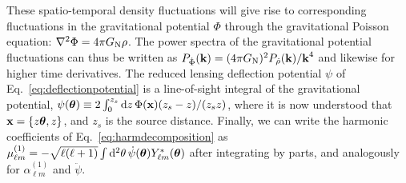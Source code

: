 \documentclass[prd,aps,twocolumn,nofootinbib,superscriptaddress,preprintnumbers,balancelastpage,longbibliography,floatfix]{revtex4-1}
\begin{document}
These spatio-temporal density fluctuations will give rise to corresponding fluctuations in the gravitational potential $\Phi$ through the gravitational Poisson equation: $\nabla^2 \Phi = 4 \pi G_\mathrm{N} \rho$. The power spectra of the gravitational potential fluctuations can thus be written as $P_{\dot{\Phi}}(\boldsymbol{\mathbf{k}}) = (4\pi G_\mathrm{N})^2 P_{\dot{\rho}}(\boldsymbol{\mathbf{k}})/\boldsymbol{\mathbf{k}}^4$ and likewise for higher time derivatives. The reduced lensing deflection potential $\psi$ of Eq.~\eqref{eq:deflectionpotential} is a line-of-sight integral of the gravitational potential, $\psi(\boldsymbol{\mathbf{\theta}}) \equiv 2 \int_0^{z_s} \mathrm{d} z \, \Phi(\boldsymbol{\mathbf{x}}) (z_s - z)/(z_s z)$, where it is now understood that $\boldsymbol{\mathbf{x}} = \lbrace z \boldsymbol{\mathbf{\theta}},z\rbrace$, and $z_s$ is the source distance. Finally, we can write the harmonic coefficients of Eq.~\eqref{eq:harmdecomposition} as $\mu_{\ell m}^{(1)} = - \sqrt{\ell(\ell+1)} \int \mathrm{d}^2\theta\, \dot{\psi}(\boldsymbol{\mathbf{\theta}}) Y_{\ell m}^*(\boldsymbol{\mathbf{\theta}})$ after integrating by parts, and analogously for $\alpha_{\ell m}^{(1)}$ and $\ddot{\psi}$.
\end{document}
